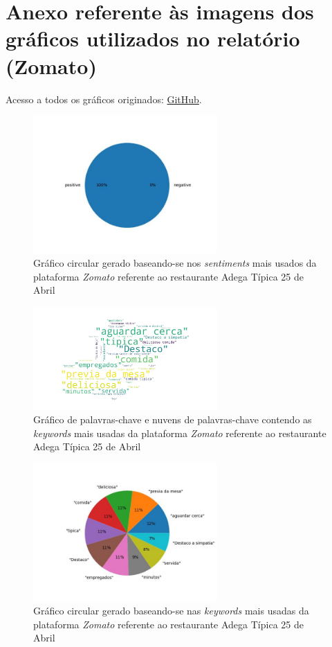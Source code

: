 \chapter{Anexo referente às imagens dos gráficos utilizados no relatório (Zomato)}
\label{an5}

Acesso a todos os gráficos originados: \href{https://github.com/CatKinKitKat/pi2021/tree/master/projecto/datascience/graphs/zomato/restaurantes}{GitHub}.

\begin{figure}[!htb]
\centering
\includegraphics[width=7cm]{figuras/Zomato/Restaurants/restaurante0_sentiments.jpeg}
\caption{Gráfico circular gerado baseando-se nos \textit{sentiments} mais usados da plataforma \textit{Zomato} referente ao restaurante Adega Típica 25 de Abril}
\label{fig:exemplofig}
\end{figure}

\begin{figure}[!htb]
\centering
\includegraphics[width=7cm]{figuras/Zomato/Restaurants/restaurante0_keywordcloud.jpeg}
\caption{Gráfico de palavras-chave e nuvens de palavras-chave contendo as \textit{keywords} mais usadas da plataforma \textit{Zomato} referente ao restaurante Adega Típica 25 de Abril}
\label{fig:exemplofig}
\end{figure}

\begin{figure}[!htb]
\centering
\includegraphics[width=7cm]{figuras/Zomato/Restaurants/restaurante0_keywords.jpeg}
\caption{Gráfico circular gerado baseando-se nas \textit{keywords} mais usadas da plataforma \textit{Zomato} referente ao restaurante Adega Típica 25 de Abril}
\label{fig:exemplofig}
\end{figure}

